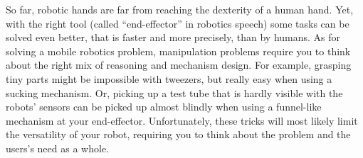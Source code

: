 So far, robotic hands are far from reaching the dexterity of a human hand. Yet, with the right tool (called ``end-effector'' in robotics speech)  some tasks can be solved even better, that is faster and more precisely, than by humans. As for solving a mobile robotics problem, manipulation problems require you to think about the right mix of reasoning and mechanism design. For example, grasping tiny parts might be impossible with tweezers, but really easy when using a sucking mechanism. Or, picking up a test tube that is hardly visible with the robots' sensors can be picked up almost blindly when using a funnel-like mechanism at your end-effector. Unfortunately, these tricks will most likely limit the versatility of your robot, requiring you to think about the problem and the users's need as a whole.





